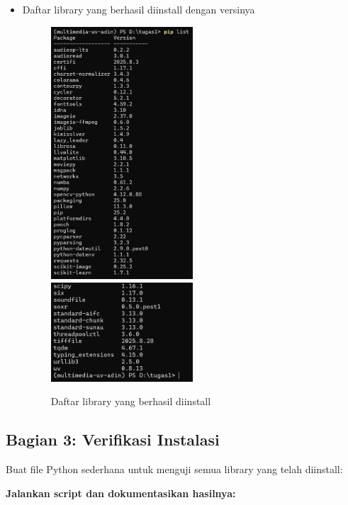 \documentclass[11pt,a4paper]{article}
\begin{document}
\begin{itemize}
    \clearpage
    \item Daftar library yang berhasil diinstall dengan versinya
        \begin{figure}[H]
            \centering
            \includegraphics[width=0.5\textwidth]{image/lib1.png}
            \includegraphics[width=0.5\textwidth]{image/lib2.png}
            \caption{Daftar library yang berhasil diinstall}
            \label{fig:video-dl}
        \end{figure}

\end{itemize}

\subsection{Bagian 3: Verifikasi Instalasi}
Buat file Python sederhana untuk menguji semua library yang telah diinstall:


\textbf{Jalankan script dan dokumentasikan hasilnya:}
\end{document}

